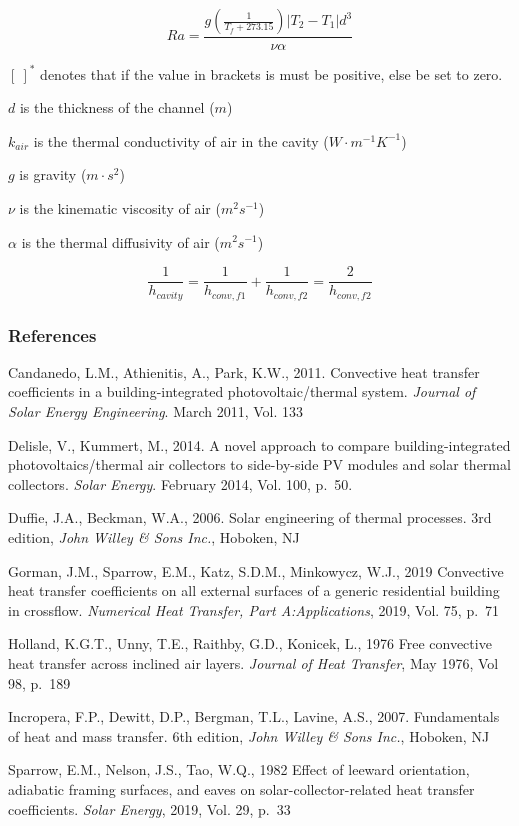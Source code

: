 \begin{equation}
Ra = \frac{g \left(\frac{1}{T_{f}+273.15}\right) \left|T_{2}-T_{1}\right| d^{3}}{\nu\alpha}
\label{eq:BIPVT-Ra}
\end{equation}

\([\:]^{*}\) denotes that if the value in brackets is must be positive, else be set to zero.

\(d\) is the thickness of the channel (\(m\))

\(k_{air}\) is the thermal conductivity of air in the cavity (\(W\cdot m^{-1}K^{-1}\))

\(g\) is gravity (\(m\cdot s^{2}\))

\(\nu\) is the kinematic viscosity of air (\(m^{2}s^{-1}\))

\(\alpha\) is the thermal diffusivity of air (\(m^{2}s^{-1}\))


\begin{equation}
\frac{1}{h_{cavity}}= \frac{1}{h_{conv,f1}}+\frac{1}{h_{conv,f2}} = \frac{2}{h_{conv,f2}}
\label{eq:BIPVT-h-cavity-2}
\end{equation}

\subsubsection{References}\label{BIPVT-references}

Candanedo, L.M., Athienitis, A., Park, K.W., 2011. Convective heat transfer coefficients in a building-integrated photovoltaic/thermal system. \emph{Journal of Solar Energy Engineering}. March 2011, Vol. 133

Delisle, V., Kummert, M., 2014. A novel approach to compare building-integrated \mbox{photovoltaics/thermal} air collectors to side-by-side PV modules and solar thermal collectors. \emph{Solar Energy}. February 2014, Vol. 100, p.~50.

Duffie, J.A., Beckman, W.A., 2006. Solar engineering of thermal processes. 3rd edition, \emph{John Willey \& Sons Inc.}, Hoboken, NJ

Gorman, J.M., Sparrow, E.M., Katz, S.D.M., Minkowycz, W.J., 2019 Convective heat transfer coefficients on all external surfaces of a generic residential building in crossflow. \emph{Numerical Heat Transfer, Part A:Applications}, 2019, Vol. 75, p.~71

Holland, K.G.T., Unny, T.E., Raithby, G.D., Konicek, L., 1976 Free convective heat transfer across inclined air layers. \emph{Journal of Heat Transfer}, May 1976, Vol 98, p.~189

Incropera, F.P., Dewitt, D.P., Bergman, T.L., Lavine, A.S., 2007. Fundamentals of heat and mass transfer. 6th edition, \emph{John Willey \& Sons Inc.}, Hoboken, NJ

Sparrow, E.M., Nelson, J.S., Tao, W.Q., 1982 Effect of leeward orientation, adiabatic framing surfaces, and eaves on solar-collector-related heat transfer coefficients. \emph{Solar Energy}, 2019, Vol. 29, p.~33